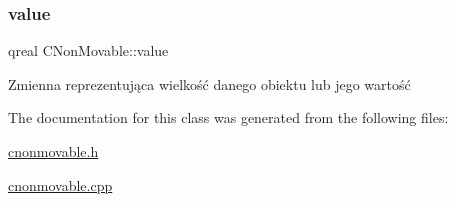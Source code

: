 \subsubsection{\texorpdfstring{value}{value}}
{\footnotesize\ttfamily qreal C\+Non\+Movable\+::value\hspace{0.3cm}{\ttfamily [protected]}}



Zmienna reprezentująca wielkość danego obiektu lub jego wartość 



The documentation for this class was generated from the following files\+:\begin{DoxyCompactItemize}
\item 
\mbox{\hyperlink{cnonmovable_8h}{cnonmovable.\+h}}\item 
\mbox{\hyperlink{cnonmovable_8cpp}{cnonmovable.\+cpp}}\end{DoxyCompactItemize}

